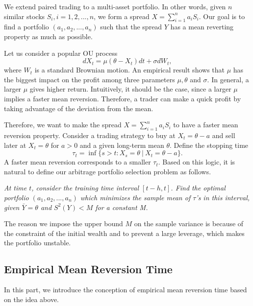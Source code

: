 \documentclass{article}
\begin{document}
We extend paired trading to a multi-asset portfolio. In other words, given $n$ similar stocks $S_i, i=1,2,...,n$, we form a spread
$X = \sum_{i=1}^n a_i S_i.$
Our goal is to find a portfolio $(a_1, a_2,...,a_n)$ such that the spread $Y$ has a mean reverting property as much as possible.

Let us consider a popular OU process
\[
dX_t = \mu (\theta - X_t) dt + \sigma dW_t,
\]
where $W_t$ is a standard Brownian motion. An empirical result shows that $\mu$ has the biggest impact on the profit among three parameters $\mu, \theta$ and $\sigma$. In general, a larger $\mu$ gives higher return. Intuitively, it should be the case, since a larger $\mu$ implies a faster mean reversion. Therefore, a trader can make a quick profit by taking advantage of the deviation from the mean.

Therefore, we want to make the spread $X=\sum_{i=1}^n a_i S_i$ to have a faster mean reversion property. Consider a trading strategy to buy at $X_t=\theta-a$ and sell later at $X_t=\theta$ for $a>0$ and a given long-term mean $\theta$. %
Define the stopping time
\begin{equation}\label{equ3}
\tau_t = \inf\{s>t: X_s=\theta\ |\ X_t = \theta - a \}.
\end{equation}
A faster mean reversion corresponds to a smaller $\tau_t$.  
Based on this logic, it is natural to define our arbitrage portfolio selection problem as follows.

\emph{At time $t$, consider the training time interval $[t-h,t]$. Find the optimal portfolio $(a_1, a_2,...,a_n)$ which minimizes the sample mean of $\tau$'s in this interval, given $\bar{Y}=\theta$ and $S^2 (Y) < M$ for a constant M.}

The reason we impose the upper bound $M$ on the sample variance is because of the constraint of the initial wealth and to prevent a large leverage, which makes the portfolio unstable.

\subsection{Empirical Mean Reversion Time}
In this part, we introduce the conception of empirical mean reversion time based on the idea above.
\end{document}
